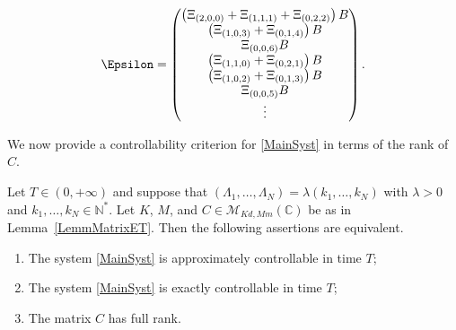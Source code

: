 \begin{remk}
\[
\Epsilon =
\begin{pmatrix}
\left(\Xi_{(2, 0, 0)} + \Xi_{(1, 1, 1)} + \Xi_{(0, 2, 2)}\right) B \\
\left(\Xi_{(1, 0, 3)} + \Xi_{(0, 1, 4)}\right) B \\
\Xi_{(0, 0, 6)} B \\
\left(\Xi_{(1, 1, 0)} + \Xi_{(0, 2, 1)}\right) B \\
\left(\Xi_{(1, 0, 2)} + \Xi_{(0, 1, 3)}\right) B \\
\Xi_{(0, 0, 5)} B \\
\vdots \\
\end{pmatrix}.
\]
\end{remk}

We now provide a controllability criterion for \eqref{MainSyst} in terms of the rank of $C$.

\begin{prop}
\label{PropCommET}
Let $T \in (0, +\infty)$ and suppose that $(\Lambda_1, \dots, \Lambda_N) = \lambda (k_1, \dots, k_N)$ with $\lambda > 0$ and $k_1, \dots, k_N \in \mathbb N^\ast$. Let $K$, $M$, and $C \in \mathcal M_{Kd, Mm}(\mathbb C)$ be as in Lemma~\ref{LemmMatrixET}. Then the following assertions are equivalent.
\begin{enumerate}
\item\label{CtrlCommETApprox} The system \eqref{MainSyst} is approximately controllable in time $T$;
\item\label{CtrlCommETExact} The system \eqref{MainSyst} is exactly controllable in time $T$;
\item\label{CtrlCommETKalman} The matrix $C$ has full rank.
\end{enumerate}
\end{prop}

